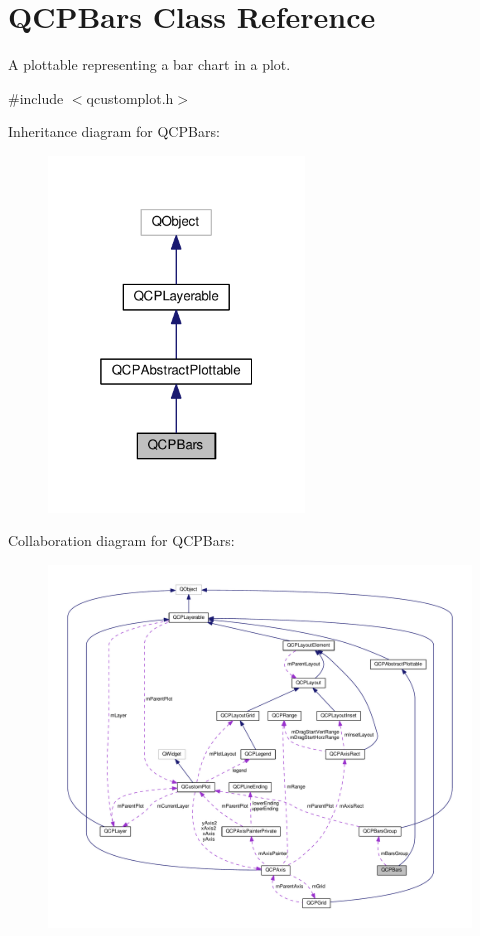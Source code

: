 \hypertarget{classQCPBars}{}\section{Q\+C\+P\+Bars Class Reference}
\label{classQCPBars}


A plottable representing a bar chart in a plot.  




{\ttfamily \#include $<$qcustomplot.\+h$>$}



Inheritance diagram for Q\+C\+P\+Bars\+:
\nopagebreak
\begin{figure}[H]
\begin{center}
\leavevmode
\includegraphics[width=193pt]{classQCPBars__inherit__graph}
\end{center}
\end{figure}


Collaboration diagram for Q\+C\+P\+Bars\+:
\nopagebreak
\begin{figure}[H]
\begin{center}
\leavevmode
\includegraphics[width=350pt]{classQCPBars__coll__graph}
\end{center}
\end{figure}
